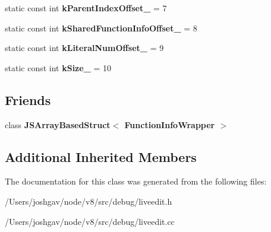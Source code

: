 \begin{DoxyCompactItemize}
\item 
static const int {\bfseries k\+Parent\+Index\+Offset\+\_\+} = 7\hypertarget{classv8_1_1internal_1_1_function_info_wrapper_a1fb3c665cf57f18585abde9c6bc5ce86}{}\label{classv8_1_1internal_1_1_function_info_wrapper_a1fb3c665cf57f18585abde9c6bc5ce86}

\item 
static const int {\bfseries k\+Shared\+Function\+Info\+Offset\+\_\+} = 8\hypertarget{classv8_1_1internal_1_1_function_info_wrapper_a461fa229141d1ad2d01f840d85aca9b0}{}\label{classv8_1_1internal_1_1_function_info_wrapper_a461fa229141d1ad2d01f840d85aca9b0}

\item 
static const int {\bfseries k\+Literal\+Num\+Offset\+\_\+} = 9\hypertarget{classv8_1_1internal_1_1_function_info_wrapper_aa25cc53446f5b5a3035506347489396c}{}\label{classv8_1_1internal_1_1_function_info_wrapper_aa25cc53446f5b5a3035506347489396c}

\item 
static const int {\bfseries k\+Size\+\_\+} = 10\hypertarget{classv8_1_1internal_1_1_function_info_wrapper_a2860e11cc35e16863dc176b80e86053a}{}\label{classv8_1_1internal_1_1_function_info_wrapper_a2860e11cc35e16863dc176b80e86053a}

\end{DoxyCompactItemize}
\subsection*{Friends}
\begin{DoxyCompactItemize}
\item 
class {\bfseries J\+S\+Array\+Based\+Struct$<$ Function\+Info\+Wrapper $>$}\hypertarget{classv8_1_1internal_1_1_function_info_wrapper_afa2900f7c737e92b2ae9ab216ea40a98}{}\label{classv8_1_1internal_1_1_function_info_wrapper_afa2900f7c737e92b2ae9ab216ea40a98}

\end{DoxyCompactItemize}
\subsection*{Additional Inherited Members}


The documentation for this class was generated from the following files\+:\begin{DoxyCompactItemize}
\item 
/\+Users/joshgav/node/v8/src/debug/liveedit.\+h\item 
/\+Users/joshgav/node/v8/src/debug/liveedit.\+cc\end{DoxyCompactItemize}

